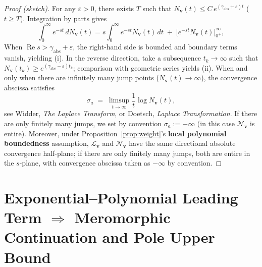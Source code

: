 \documentclass[11pt,a4paper]{article}
\theoremstyle{remark}
\DeclareMathOperator{\Re}{Re}
\begin{document}
\begin{proof}[Proof (sketch)]
For any $\varepsilon>0$, there exists $T$ such that $N_{\mathbf{v}}(t)\le C\,e^{(\gamma_{\mathrm{abs}}+\varepsilon)t}$ ($t\ge T$). Integration by parts gives
\begin{equation}
\int_0^\infty e^{-s t}\,dN_{\mathbf{v}}(t)
=s\int_0^\infty e^{-s t}N_{\mathbf{v}}(t)\,dt
\; +\;\big[e^{-s t}N_{\mathbf{v}}(t)\big]_{0^+}^{\infty},
\end{equation}
When $\Re s>\gamma_{\mathrm{abs}}+\varepsilon$, the right-hand side is bounded and boundary terms vanish, yielding (i). In the reverse direction, take a subsequence $t_k\to\infty$ such that $N_{\mathbf{v}}(t_k)\ge e^{(\gamma_{\mathrm{abs}}-\varepsilon)t_k}$; comparison with geometric series yields (ii). When and only when there are infinitely many jump points ($N_{\mathbf{v}}(t)\to\infty$), the convergence abscissa satisfies
\begin{equation}
\sigma_a\;=\;\limsup_{t\to\infty}\frac{1}{t}\log N_{\mathbf{v}}(t),
\end{equation}
see Widder, \textit{The Laplace Transform}, or Doetsch, \textit{Laplace Transformation}. If there are only finitely many jumps, we set by convention $\sigma_a:=-\infty$ (in this case $\mathscr{N}_{\mathbf{v}}$ is entire). Moreover, under Proposition~\ref{prop:weight}'s \textbf{local polynomial boundedness} assumption, $\mathcal{L}_{\mathbf{v}}$ and $\mathscr{N}_{\mathbf{v}}$ have the same directional absolute convergence half-plane; if there are only finitely many jumps, both are entire in the $s$-plane, with convergence abscissa taken as $-\infty$ by convention.
\end{proof}

\section{Exponential--Polynomial Leading Term $\Rightarrow$ Meromorphic Continuation and Pole Upper Bound}
\end{document}
